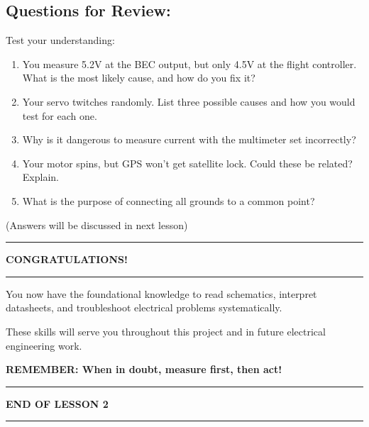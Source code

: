 \documentclass[11pt,letterpaper]{article}
\begin{document}
\subsection*{Questions for Review:}

Test your understanding:

\begin{enumerate}
\item You measure 5.2V at the BEC output, but only 4.5V at the flight controller. What is the most likely cause, and how do you fix it?

\item Your servo twitches randomly. List three possible causes and how you would test for each one.

\item Why is it dangerous to measure current with the multimeter set incorrectly?

\item Your motor spins, but GPS won't get satellite lock. Could these be related? Explain.

\item What is the purpose of connecting all grounds to a common point?
\end{enumerate}

(Answers will be discussed in next lesson)

\vspace{2em}

\begin{center}
\rule{\textwidth}{2pt}
\textbf{\Large CONGRATULATIONS!}\\[0.5em]
\rule{\textwidth}{2pt}
\end{center}

You now have the foundational knowledge to read schematics, interpret datasheets, and troubleshoot electrical problems systematically.

These skills will serve you throughout this project and in future electrical engineering work.

\begin{center}
\textbf{\Large REMEMBER: When in doubt, measure first, then act!}
\end{center}

\vspace{2em}

\begin{center}
\rule{\textwidth}{2pt}
\textbf{END OF LESSON 2}\\
\rule{\textwidth}{2pt}
\end{center}
\end{document}
